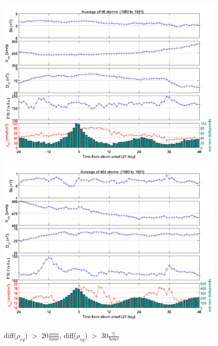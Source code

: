 \documentclass[10pt,twocolumn]{article}
\begin{document}
\begin{figure}[htp!]
\centering
\includegraphics[scale=0.7]{paperfigures/stormavs-diffden-10amu.png}
\includegraphics[scale=0.7]{paperfigures/stormavs-diffden-30percent.png}
\caption{diff($\rho_{eq}$) $>$ 20$\frac{amu}{hour}$, diff($\rho_{eq}$) $>$ 30$\frac{\%}{hour}$}
\label{rhochange}
\end{figure}
\clearpage
\end{document}
